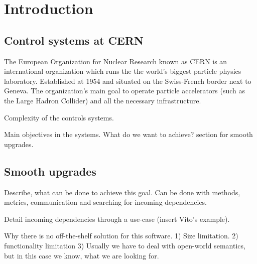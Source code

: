 \chapter{Introduction}


\section{Control systems at CERN}

The European Organization for Nuclear Research known as CERN is an international
organization which runs the the world's biggest particle physics laboratory.
Established at 1954 and situated on the Swiss-French border next to Geneva. The
organization's main goal to operate particle accelerators (such as the Large
Hadron Collider) and all the necessary infrastructure.



Complexity of the controls systems.

Main objectives in the systems. What do we want to achieve? %
section for smooth upgrades.

\section{Smooth upgrades}

Describe, what can be done to achieve this goal. Can be done with methods,
metrics, communication and searching for incoming dependencies.
 
Detail incoming dependencies through a use-case (insert Vito's example).

Why there is no off-the-shelf solution for this software. 1) Size limitation. 2)
functionality limitation 3) Usually we have to deal with open-world semantics,
but in this case we know, what we are looking for.


